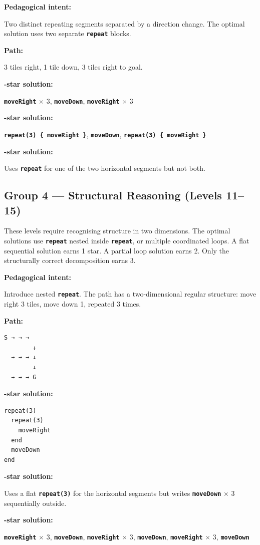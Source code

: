 \documentclass[12pt,a4paper]{article}
\newcommand{\keyword}[1]{\textcolor{keyword}{\texttt{\bfseries #1}}}
\newcommand{\gddfield}[2]{%
  \noindent\begin{minipage}[t]{3.5cm}\bfseries\color{accent}\sffamily#1\end{minipage}%
  \hspace{8pt}%
  \begin{minipage}[t]{\dimexpr\linewidth-3.5cm-8pt\relax}%
    #2
  \end{minipage}\par\smallskip}
\begin{document}
\begin{tcolorbox}[gddbox, title={Level 10 — Two Segments}]
\gddfield{Pedagogical intent:}{Two distinct repeating segments separated by a direction change. The optimal solution uses two separate \keyword{repeat} blocks.}
\gddfield{Path:}{3 tiles right, 1 tile down, 3 tiles right to goal.}
\gddfield{1-star solution:}{\keyword{moveRight} $\times$ 3, \keyword{moveDown}, \keyword{moveRight} $\times$ 3}
\gddfield{3-star solution:}{\keyword{repeat(3) \{ moveRight \}}, \keyword{moveDown}, \keyword{repeat(3) \{ moveRight \}}}
\gddfield{2-star solution:}{Uses \keyword{repeat} for one of the two horizontal segments but not both.}
\end{tcolorbox}

\subsection{Group 4 — Structural Reasoning (Levels 11--15)}

\begin{tcolorbox}[gddbox, title={Group Design Note}]
These levels require recognising structure in two dimensions. The optimal solutions use \keyword{repeat} nested inside \keyword{repeat}, or multiple coordinated loops. A flat sequential solution earns 1 star. A partial loop solution earns 2. Only the structurally correct decomposition earns 3.
\end{tcolorbox}

\begin{tcolorbox}[gddbox, title={Level 11 — Column Descent}]
\gddfield{Pedagogical intent:}{Introduce nested \keyword{repeat}. The path has a two-dimensional regular structure: move right 3 tiles, move down 1, repeated 3 times.}
\gddfield{Path:}{%
\begin{lstlisting}[language=RobotScript, numbers=none]
S → → →
        ↓
  → → → ↓
        ↓
  → → → G
\end{lstlisting}}
\gddfield{3-star solution:}{%
\begin{lstlisting}[language=RobotScript]
repeat(3)
  repeat(3)
    moveRight
  end
  moveDown
end
\end{lstlisting}}
\gddfield{2-star solution:}{Uses a flat \keyword{repeat(3)} for the horizontal segments but writes \keyword{moveDown} $\times$ 3 sequentially outside.}
\gddfield{1-star solution:}{\keyword{moveRight} $\times$ 3, \keyword{moveDown}, \keyword{moveRight} $\times$ 3, \keyword{moveDown}, \keyword{moveRight} $\times$ 3, \keyword{moveDown}}
\end{tcolorbox}
\end{document}

